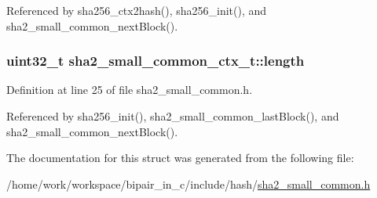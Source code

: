 Referenced by sha256\-\_\-ctx2hash(), sha256\-\_\-init(), and sha2\-\_\-small\-\_\-common\-\_\-next\-Block().

\hypertarget{structsha2__small__common__ctx__t_aa866ef6a2ab6cfe438eb41cc3828c9b8}{
\subsubsection[{length}]{\setlength{\rightskip}{0pt plus 5cm}uint32\-\_\-t sha2\-\_\-small\-\_\-common\-\_\-ctx\-\_\-t\-::length}}\label{structsha2__small__common__ctx__t_aa866ef6a2ab6cfe438eb41cc3828c9b8}


Definition at line 25 of file sha2\-\_\-small\-\_\-common.\-h.



Referenced by sha256\-\_\-init(), sha2\-\_\-small\-\_\-common\-\_\-last\-Block(), and sha2\-\_\-small\-\_\-common\-\_\-next\-Block().



The documentation for this struct was generated from the following file\-:\begin{DoxyCompactItemize}
\item 
/home/work/workspace/bipair\-\_\-in\-\_\-c/include/hash/\hyperlink{sha2__small__common_8h}{sha2\-\_\-small\-\_\-common.\-h}\end{DoxyCompactItemize}
